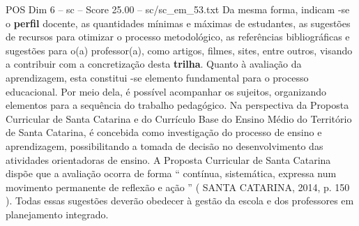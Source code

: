 \begin{textsample}{POS Dim 6 – sc – Score 25.00 – sc/sc\_em\_53.txt}
Da mesma forma, indicam -se o \textbf{perfil} docente, as quantidades mínimas e máximas de estudantes, as sugestões de recursos para otimizar o processo metodológico, as referências bibliográficas e sugestões para o(a) professor(a), como artigos, filmes, sites, entre outros, visando a contribuir com a concretização desta \textbf{trilha}.
Quanto à avaliação da aprendizagem, esta constitui -se elemento fundamental para o processo educacional.
Por meio dela, é possível acompanhar os sujeitos, organizando elementos para a sequência do trabalho pedagógico.
Na perspectiva da Proposta Curricular de Santa Catarina e do Currículo Base do Ensino Médio do Território de Santa Catarina, é concebida como investigação do processo de ensino e aprendizagem, possibilitando a tomada de decisão no desenvolvimento das atividades orientadoras de ensino.
A Proposta Curricular de Santa Catarina dispõe que a avaliação ocorra de forma “ contínua, sistemática, expressa num movimento permanente de reflexão e ação ” ( SANTA CATARINA, 2014, p. 150 ).
Todas essas sugestões deverão obedecer à gestão da escola e dos professores em planejamento integrado.

\end{textsample}
